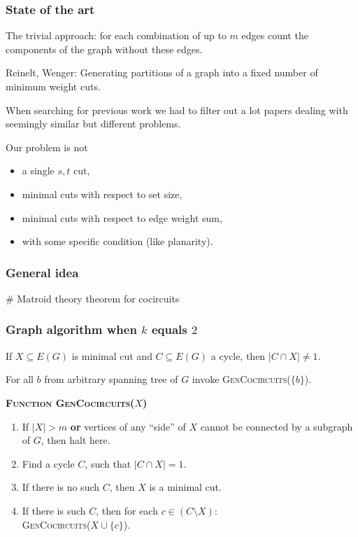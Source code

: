 \documentclass[10pt]{beamer}
\begin{document}
\begin{frame}[fragile]
	\frametitle{State of the art}

    The trivial approach: for each combination of up to $m$ edges count
    the components of the graph without these edges.

    \medskip

    Reinelt, Wenger: Generating partitions
    of a graph into a fixed number of minimum weight cuts.

    \medskip

    When searching for previous work we had to filter out a lot papers
    dealing with seemingly similar but different problems.

    \medskip

	Our problem is not
	\begin{itemize}
		\item a single $s,t$ cut,
		\item minimal cuts with respect to set size,
		\item minimal cuts with respect to edge weight sum,
		\item with some specific condition (like planarity).
	\end{itemize}

\end{frame}

\begin{frame}[fragile]
    \frametitle{General idea}

    # Matroid theory theorem for cocircuits

\end{frame}

\begin{frame}[fragile]
	\frametitle{Graph algorithm when $k$ equals $2$}

	If $X \subseteq E(G)$ is minimal cut and $C \subseteq E(G)$ a cycle,
    then $\lvert C \cap X \rvert \neq 1$.

    \bigskip

    For all $b$ from arbitrary spanning tree of $G$ invoke \textsc{GenCocircuits}($\{b\}$).

	\textbf{\textsc{Function GenCocircuits}($X$)}
	\begin{enumerate}
		\item If $\lvert X \rvert > m$ \textbf{or} vertices of any
            ``side'' of $X$ cannot be connected by a subgraph of $G$,
            then halt here.
		\item Find a cycle $C$, such that $\lvert C \cap X \rvert = 1$.
		\item If there is no such $C$, then $X$ is a minimal cut.
		\item If there is such $C$, then for each $c \in (C \setminus X)$: \\
			\hspace{12pt} \textsc{GenCocircuits}($X \cup \{c\}$).
	\end{enumerate}

\end{frame}
\end{document}
